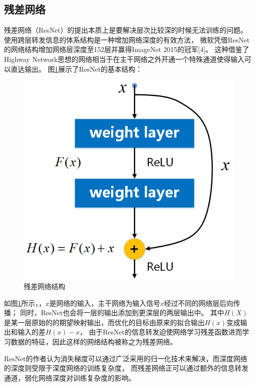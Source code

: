 \subsection{残差网络}
残差网络（ResNet）的提出本质上是要解决层次比较深的时候无法训练的问题。
使用跨层转发信息的体系结构是一种增加网络深度的有效方法，
微软凭借ResNet的网络结构增加网络层深度至152层并赢得ImageNet 2015的冠军[4]。
这种借鉴了Highway Network思想的网络相当于在主干网络之外开通一个特殊通道使得输入可以直达输出。
图\ref{sec:fig_5_6}展示了ResNet的基本结构：\par
\begin{figure}[!h]
	\centering
	\includegraphics[scale=0.6]{figures/chapter_5/fig_5_6}
	\caption{残差网络结构}\label{sec:fig_5_6}
\end{figure}
如图\ref{sec:fig_5_6}所示，，$x$是网络的输入，主干网络为输入信号$x$经过不同的网络层后向传播；
同时，ResNet也会将一层的输出添加到更深层的两层输出中。
其中$H(X)$是某一层原始的的期望映射输出，而优化的目标由原来的拟合输出$H(x)$变成输出和输入的差$H(x)-x$，
由于ResNet的信息转发迫使网络学习残差函数进而学习数据的特征，因此这样的网络结构被称之为残差网络。\par
ResNet的作者认为消失梯度可以通过广泛采用的归一化技术来解决，而深度网络的深度则受限于深度网络的训练复杂度，
而残差网络正可以通过额外的信息转发通道，弱化网络深度对训练复杂度的影响。\par


